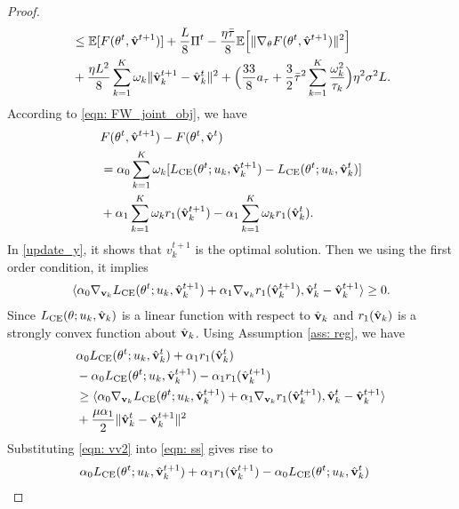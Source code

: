 \documentclass[twoside,journal]{IEEEtran}
\def\VectorFont{\bf}
\newcommand{\vv}{{\VectorFont v}}
\begin{document}
\begin{proof}
\begin{align}
\nonumber&\leq \mathbb{E}[F(\theta^{t},\hat{\vv}^{t+1})]+\frac{L}{8}\Pi^{t}
-\frac{\eta\bar{\tau} }{8}\mathbb{E}\Big[\|
\nabla_{\theta}F(\theta^{t},\hat{\vv}^{t+1})
\|^2\Big]\\
&
+\frac{\eta L^2}{8}\sum_{k=1}^K\omega_k\|\hat{\vv}_k^{t+1}-
\hat \vv_k^{t}\|^2+\Big(\frac{33}{8}a_{\tau}
+\frac{3}{2}\bar{\tau}^2\sum_{k=1}^K\frac{\omega_k^2}{\tau_k}\Big)\eta^2\sigma^2L.
\end{align}
According to \eqref{eqn: FW_joint_obj}, we have
\begin{align}\label{eqn: vv1}
\nonumber &F(\theta^{t},\hat{\vv}^{t+1})-F(\theta^{t},\hat{\vv}^t)\\
\nonumber&
=\alpha_0\sum_{k=1}^K\omega_k[L_{\rm CE}(\theta^{t}; u_k, \hat{\vv}_k^{t+1})-
L_{\rm CE}(\theta^{t}; u_k, \hat{\vv}_k^{t})]\\
&+\alpha_1\sum_{k=1}^K\omega_kr_1(\hat{\vv}_k^{t+1})-
\alpha_1\sum_{k=1}^K\omega_kr_1(\hat{\vv}_k^{t}).
\end{align}
In \eqref{update_y}, it shows that $v_{k}^{t+1}$ is the optimal solution. Then we using the first order condition, it implies
\begin{align}\label{eqn: vv2}
\langle \alpha_0\nabla_{\vv_k} L_{\rm CE}(\theta^{t}; u_{k}, \hat{\vv}_{k}^{t+1})
+\alpha_1 \nabla_{\vv_k} r_1(\hat{\vv}_k^{t+1}),\hat{\vv}_{k}^{t}
-\hat{\vv}_{k}^{t+1}\rangle\geq 0.
\end{align}
Since $L_{\rm CE}(\theta; u_k, \hat{\vv}_k)$ is a linear function with respect to $\hat{\vv}_k$ and $r_1(\hat{\vv}_k)$ is a strongly convex function about $\hat{\vv}_k$. Using Assumption \ref{ass: reg}, we have
\begin{align}\label{eqn: ss}
\nonumber &\alpha_0L_{\rm CE}(\theta^{t}; u_{k}, \hat{\vv}_{k}^{t})
+\alpha_1  r_1(\hat{\vv}_k^{t})\\
\nonumber&-\alpha_0L_{\rm CE}(\theta^{t}; u_{k}, \hat{\vv}_{k}^{t+1})
-\alpha_1  r_1(\hat{\vv}_k^{t+1})\\
\nonumber&\geq \langle \alpha_0\nabla_{\vv_k} L_{\rm CE}(\theta^{t}; u_{k}, \hat{\vv}_{k}^{t+1})
+\alpha_1 \nabla_{\vv_k} r_1(\hat{\vv}_k^{t+1}),\hat{\vv}_{k}^{t}-\hat{\vv}_{k}^{t+1}\rangle\\ &+\frac{\mu\alpha_1}{2}\|
\hat{\vv}_{k}^{t}-\hat{\vv}_{k}^{t+1}\|^2
\end{align}
Substituting \eqref{eqn: vv2} into \eqref{eqn: ss} gives rise to
\begin{align}\label{eqn: ss1}
\nonumber&\alpha_0L_{\rm CE}(\theta^{t}; u_{k}, \hat{\vv}_{k}^{t+1})
+\alpha_1  r_1(\hat{\vv}_k^{t+1})-\alpha_0L_{\rm CE}(\theta^{t}; u_{k}, \hat{\vv}_{k}^{t})

\end{align}
\end{proof}
\end{document}
